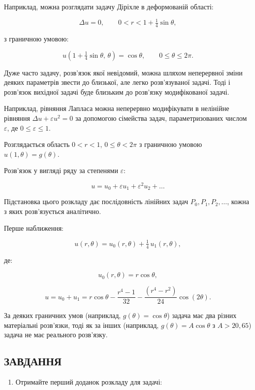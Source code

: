 \documentclass[
  ukrainian,
]{article}
\providecommand{\tightlist}{%
  \setlength{\itemsep}{0pt}\setlength{\parskip}{0pt}}
\begin{document}
Наприклад, можна розглядати задачу Діріхле в деформованій області:

\[\Delta u = 0, \qquad 0 < r < 1 + \tfrac{1}{4}\sin\theta,\]

з граничною умовою:

\[u\!\left(1+\tfrac{1}{4}\sin\theta,\,\theta\right) = \cos\theta, \qquad 0 \le \theta \le 2\pi.\]

Дуже часто задачу, розв'язок якої невідомий, можна шляхом неперервної
зміни деяких параметрів звести до близької, але легко розв'язуваної
задачі. Тоді і розв'язок вихідної задачі буде близьким до розв'язку
модифікованої задачі.

Наприклад, рівняння Лапласа можна неперервно модифікувати в нелінійне
рівняння \(\Delta u + \varepsilon u^2 = 0\) за допомогою сімейства
задач, параметризованих числом \(\varepsilon\), де
\(0 \le \varepsilon \le 1\).

Розглядається область \(0 < r < 1\), \(0 \le \theta < 2\pi\) з граничною
умовою \(u(1,\theta) = g(\theta)\).

Розв'язок у вигляді ряду за степенями \(\varepsilon\):

\[u = u_0 + \varepsilon u_1 + \varepsilon^2 u_2 + \dots\]

Підстановка цього розкладу дає послідовність лінійних задач
\(P_0, P_1, P_2, \ldots\), кожна з яких розв'язується аналітично.

Перше наближення:

\[u(r,\theta) = u_0(r,\theta) + \tfrac{1}{4}\,u_1(r,\theta),\]

де:

\[u_0(r,\theta) = r\cos\theta,\]

\[u = u_0 + u_1 = r\cos\theta - \frac{r^4-1}{32} - \frac{(r^4-r^2)}{24}\cos(2\theta).\]

За деяких граничних умов (наприклад, \(g(\theta) = \cos\theta\)) задача
має два різних матеріальні розв'язки, тоді як за інших (наприклад,
\(g(\theta) = A\cos\theta\) з \(A > 20{,}65\)) задача не має реального
розв'язку.

\subsection{ЗАВДАННЯ}\label{ux437ux430ux432ux434ux430ux43dux43dux44f-27}

\begin{enumerate}
\def\labelenumi{\arabic{enumi}.}
\tightlist
\item
  Отримайте перший доданок розкладу для задачі:
\end{enumerate}
\end{document}
